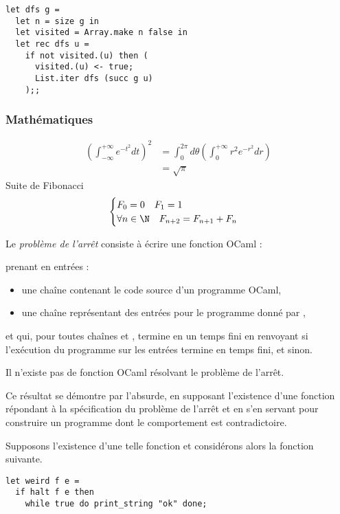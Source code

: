 \documentclass[envcountsect]{cs-mpi-slides}
\begin{document}
\begin{frame}[fragile]
\begin{lstlisting}[frame=tb]
let dfs g =
  let n = size g in
  let visited = Array.make n false in
  let rec dfs u =
    if not visited.(u) then (
      visited.(u) <- true;
      List.iter dfs (succ g u)
    );;
\end{lstlisting}
\end{frame}
\begin{frame}[fragile]
\frametitle{Mathématiques}
\begin{align*}
\left( \int_{-\infty}^{+\infty} e^{-t^2} dt \right)^{2} & = 
\int_{0}^{2\pi} d\theta \left( \int_{0}^{+\infty} r^{2} e^{-r^2} dr \right)
\\
&= \sqrt{\pi}
\end{align*}
Suite de Fibonacci
\[
\begin{cases}
F_0 = 0 \quad F_1 = 1 \\
\forall n \in \N \quad F_{n+2} = F_{n+1} + F_{n}
\end{cases}
\]
\end{frame}
\begin{frame}[fragile]
\begin{definition}
Le \emph{problème de l'arrêt} consiste à écrire une fonction OCaml :
\\
\centerline{}
prenant en entrées :
\begin{itemize}
\item une chaîne  contenant le code source d'un programme OCaml,
\item une chaîne  représentant des entrées pour le programme donné par ,
\end{itemize}
et qui, pour toutes chaînes  et , termine en un temps fini en renvoyant  si l'exécution du programme  sur les entrées  termine en temps fini, et  sinon.
\end{definition}
\end{frame}
\begin{frame}[fragile]
\begin{theorem}
Il n'existe pas de fonction OCaml résolvant le problème de l'arrêt.
\end{theorem}
%
\begin{demo}
Ce résultat se démontre par l'absurde, en supposant l'existence d'une fonction  répondant à la spécification du problème de l'arrêt et en s'en servant pour construire un programme dont le comportement est contradictoire.

Supposons l'existence d'une telle fonction  et considérons alors la fonction  suivante.
\begin{lstlisting}
let weird f e =
  if halt f e then
    while true do print_string "ok" done;
\end{lstlisting}
\end{demo}
\end{frame}
\end{document}
